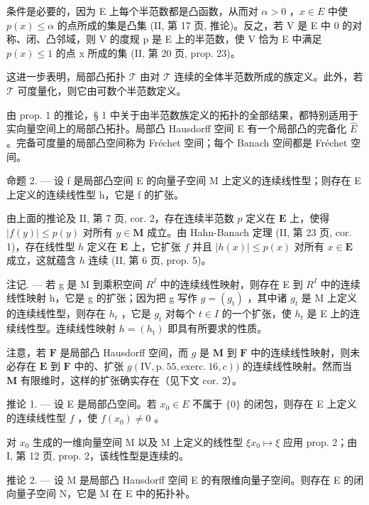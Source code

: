 条件是必要的，因为 E 上每个半范数都是凸函数，从而对 \(\alpha > 0\) ，\(x \in E\) 中使 \(p(x) \leqslant \alpha\) 的点所成的集是凸集 (II, 第 17 页, 推论)。反之，若 V 是 E 中 0 的对称、闭、凸邻域，则 V 的度规 p 是 E 上的半范数，使 V 恰为 E 中满足 \(p(x) \leqslant 1\) 的点 x 所成的集 (II, 第 20 页, prop. 23)。

这进一步表明，局部凸拓扑 \(\mathcal{T}\) 由对 \(\mathcal{T}\) 连续的全体半范数所成的族定义。此外，若 \(\mathcal{T}\) 可度量化，则它由可数个半范数定义。

由 prop. 1 的推论，§ 1 中关于由半范数族定义的拓扑的全部结果，都特别适用于实向量空间上的局部凸拓扑。局部凸 Hausdorff 空间 E 有一个局部凸的完备化 \(\hat{E}\) 。完备可度量的局部凸空间称为 Fréchet 空间；每个 Banach 空间都是 Fréchet 空间。

命题 2. --- 设 f 是局部凸空间 E 的向量子空间 M 上定义的连续线性型；则存在 E 上定义的连续线性型 h，它是 f 的扩张。

由上面的推论及 II, 第 7 页, cor. 2，存在连续半范数 \(p\) 定义在 \(\mathbf{E}\) 上，使得 \(|f(y)| \leqslant p(y)\) 对所有 \(y \in \mathbf{M}\) 成立。由 Hahn-Banach 定理 (II, 第 23 页, cor. 1)，存在线性型 \(h\) 定义在 \(\mathbf{E}\) 上，它扩张 \(f\) 并且 \(|h(x)| \leqslant p(x)\) 对所有 \(x \in \mathbf{E}\) 成立，这就蕴含 \(h\) 连续 (II, 第 6 页, prop. 5)。

注记. --- 若 g 是 M 到乘积空间 \(R^{I}\) 中的连续线性映射，则存在 E 到 \(R^{I}\) 中的连续线性映射 h，它是 g 的扩张；因为把 g 写作 \(g = (g_{\mathrm{t}})\) ，其中诸 \(g_{t}\) 是 M 上定义的连续线性型，则存在 \(h_{t}\) ，它是 \(g_{t}\) 对每个 \(t \in I\) 的一个扩张，使 \(h_{t}\) 是 E 上的连续线性型。连续线性映射 \(h = (h_{\mathrm{t}})\) 即具有所要求的性质。

注意，若 \(\mathbf{F}\) 是局部凸 Hausdorff 空间，而 \(g\) 是 \(\mathbf{M}\) 到 \(\mathbf{F}\) 中的连续线性映射，则未必存在 \(\mathbf{E}\) 到 \(\mathbf{F}\) 中的、扩张 \(g(\mathrm{IV},\mathrm{p.~55},\mathrm{exerc.~16},c))\) 的连续线性映射。然而当 \(\mathbf{M}\) 有限维时，这样的扩张确实存在（见下文 cor. 2）。

推论 1. --- 设 E 是局部凸空间。若 \(x_0 \in E\) 不属于 \(\{0\}\) 的闭包，则存在 E 上定义的连续线性型 \(f\) ，使 \(f(x_0) \neq 0\) 。

对 \(x_0\) 生成的一维向量空间 M 以及 M 上定义的线性型 \(\xi x_0 \mapsto \xi\) 应用 prop. 2；由 I, 第 12 页, prop. 2，该线性型是连续的。

推论 2. --- 设 M 是局部凸 Hausdorff 空间 E 的有限维向量子空间。则存在 E 的闭向量子空间 N，它是 M 在 E 中的拓扑补。

